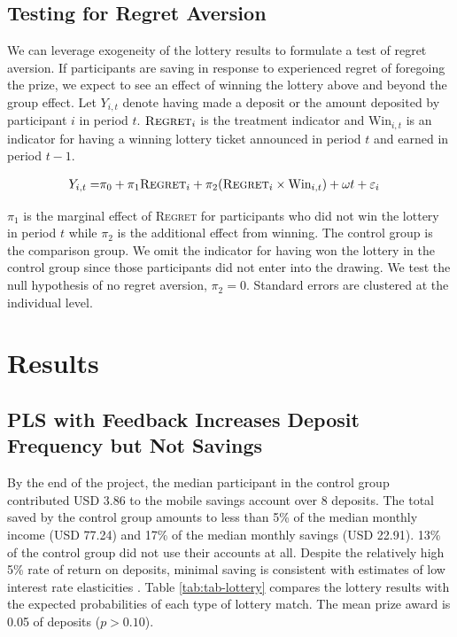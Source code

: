 \documentclass[12pt]{article}
\begin{document}
	\subsection{Testing for Regret Aversion}

		We can leverage exogeneity of the lottery results to formulate a test of regret aversion. If participants are saving in response to experienced regret of foregoing the prize, we expect to see an effect of winning the lottery above and beyond the group effect. Let $Y_{i,t}$ denote having made a deposit or the amount deposited by participant $i$ in period $t$. $\text{\textsc{Regret}}_{i}$ is the treatment indicator and $\text{Win}_{i,t}$ is an indicator for having a winning lottery ticket announced in period $t$ and earned in period $t-1$.

		\begin{equation} \begin{split}
		Y_{i,t} = & \pi_{0} + \pi_{1}\text{\textsc{Regret}}_{i} + \pi_{2}(\text{\textsc{Regret}}_{i} \times \text{Win}_{i,t}) + \omega t + \varepsilon_{i}
		\end{split} \label{eq:regret} \end{equation}

		$\pi_1$ is the marginal effect of \textsc{Regret} for participants who did not win the lottery in period $t$ while $\pi_2$ is the additional effect from winning. The control group is the comparison group. We omit the indicator for having won the lottery in the control group since those participants did not enter into the drawing. We test the null hypothesis of no regret aversion, $\pi_2 = 0$. Standard errors are clustered at the individual level.

\section{Results} \label{sec:results}

	\subsection{PLS with Feedback Increases Deposit Frequency but Not Savings}

		By the end of the project, the median participant in the control group contributed USD 3.86 to the mobile savings account over 8 deposits. The total saved by the control group amounts to less than 5\% of the median monthly income (USD 77.24) and 17\% of the median monthly savings (USD 22.91). 13\% of the control group did not use their accounts at all. Despite the relatively high 5\% rate of return on deposits, minimal saving is consistent with estimates of low interest rate elasticities . Table \ref{tab:tab-lottery} compares the lottery results with the expected probabilities of each type of lottery match. The mean prize award is 0.05 of deposits ($p > 0.10$).
\end{document}
